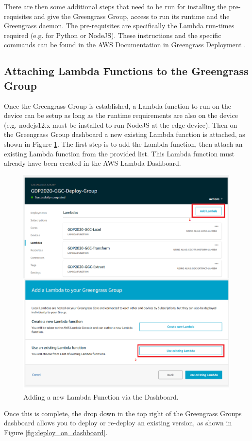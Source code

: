There are then some additional steps that need to be run for installing the pre-requisites and give the Greengrass Group, access to run its runtime and the Greengrass daemon. The pre-requisites are specifically the Lambda run-times required (e.g. for Python or NodeJS). These instructions and the specific commands can be found in the AWS Documentation in Greengrass Deployment \cite{greengrass_deployment}.

\subsection{Attaching Lambda Functions to the Greengrass Group}
Once the Greengrass Group is established, a Lambda function to run on the device can be setup as long as the runtime requirements are also on the device (e.g. nodejs12.x must be installed to run NodeJS at the edge device). Then on the Greengrass Group dashboard a new existing Lambda function is attached, as shown in Figure \ref{fig:adding_new_lambda_to_ggc}. The first step is to add the Lambda function, then attach an existing Lambda function from the provided list. This Lambda function must already have been created in the AWS Lambda Dashboard.

\begin{figure}[ht]
    \centering
    \includegraphics[width=0.7\linewidth]{pages/Chapter4/Chapter 4 Images/greengrass_new_lambda.png}
    \caption{Adding a new Lambda Function via the Dashboard.}
    \label{fig:adding_new_lambda_to_ggc}
\end{figure}

Once this is complete, the drop down in the top right of the Greengrass Groups dashboard allows you to deploy or re-deploy an existing version, as shown in Figure \ref{fig:deploy_on_dashboard}.

